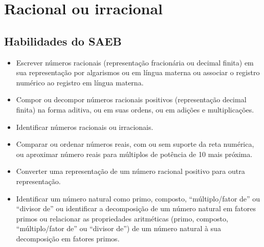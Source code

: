 \chapter{Racional ou irracional}

\section{Habilidades do SAEB}

\begin{itemize}
\item
  Escrever números racionais (representação fracionária ou decimal
  finita) em sua representação por algarismos ou em língua materna ou
  associar o registro numérico ao registro em língua materna.
\item
  Compor ou decompor números racionais positivos (representação decimal
  finita) na forma aditiva, ou em suas ordens, ou em adições e
  multiplicações.
\item
  Identificar números racionais ou irracionais.
\item
  Comparar ou ordenar números reais, com ou sem suporte da reta
  numérica, ou aproximar número reais para múltiplos de potência de 10
  mais próxima.
\item
  Converter uma representação de um número racional positivo para outra
  representação.
\item
  Identificar um número natural como primo, composto, ``múltiplo/fator
  de'' ou ``divisor de'' ou identificar a decomposição de um número
  natural em fatores primos ou relacionar as propriedades aritméticas
  (primo, composto, ``múltiplo/fator de'' ou ``divisor de'') de um
  número natural à sua decomposição em fatores primos.
\end{itemize}

